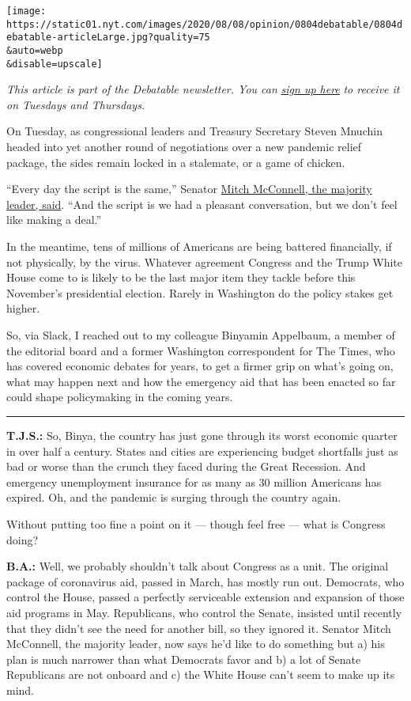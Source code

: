 \texttt{[image: https://static01.nyt.com/images/2020/08/08/opinion/0804debatable/0804debatable-articleLarge.jpg?quality=75\\\&auto=webp\\\&disable=upscale]}

\emph{This article is part of the Debatable newsletter. You can}
\href{https://www.nytimes.com/newsletters/debatable}{\emph{sign up
here}} \emph{to receive it on Tuesdays and Thursdays.}

On Tuesday, as congressional leaders and Treasury Secretary Steven
Mnuchin headed into yet another round of negotiations over a new
pandemic relief package, the sides remain locked in a stalemate, or a
game of chicken.

``Every day the script is the same,'' Senator
\href{https://www.bloomberg.com/news/articles/2020-08-04/pelosi-mnuchin-signal-first-halting-progress-on-stimulus-deal}{Mitch
McConnell, the majority leader, said}. ``And the script is we had a
pleasant conversation, but we don't feel like making a deal.''

In the meantime, tens of millions of Americans are being battered
financially, if not physically, by the virus. Whatever agreement
Congress and the Trump White House come to is likely to be the last
major item they tackle before this November's presidential election.
Rarely in Washington do the policy stakes get higher.

So, via Slack, I reached out to my colleague Binyamin Appelbaum, a
member of the editorial board and a former Washington correspondent for
The Times, who has covered economic debates for years, to get a firmer
grip on what's going on, what may happen next and how the emergency aid
that has been enacted so far could shape policymaking in the coming
years.

\begin{center}\rule{0.5\linewidth}{\linethickness}\end{center}

\textbf{T.J.S.:} So, Binya, the country has just gone through its worst
economic quarter in over half a century. States and cities are
experiencing budget shortfalls just as bad or worse than the crunch they
faced during the Great Recession. And emergency unemployment insurance
for as many as 30 million Americans has expired. Oh, and the pandemic is
surging through the country again.

Without putting too fine a point on it --- though feel free --- what is
Congress doing?

\textbf{B.A.:} Well, we probably shouldn't talk about Congress as a
unit. The original package of coronavirus aid, passed in March, has
mostly run out. Democrats, who control the House, passed a perfectly
serviceable extension and expansion of those aid programs in May.
Republicans, who control the Senate, insisted until recently that they
didn't see the need for another bill, so they ignored it. Senator Mitch
McConnell, the majority leader, now says he'd like to do something but
a) his plan is much narrower than what Democrats favor and b) a lot of
Senate Republicans are not onboard and c) the White House can't seem to
make up its mind.

